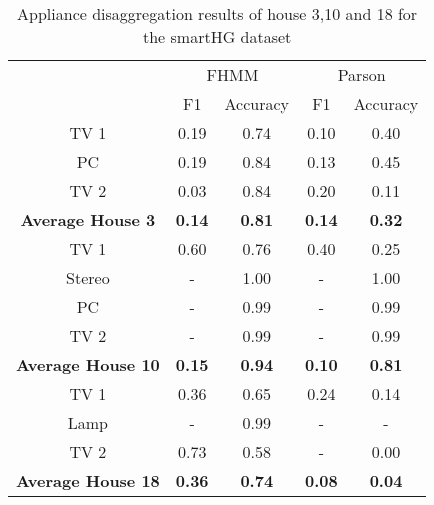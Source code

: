 \begin{table}[H]                             
\centering                                   
\begin{tabular}{c|c|c|c|c|}  
\cline{2-5}                                      
 & \multicolumn{2}{|c|}{FHMM} & \multicolumn{2}{c|}{Parson} \\                      
\cline{2-5}                                        
 & F1 & Accuracy & F1 & Accuracy \\          
\hline                                       
\multicolumn{1}{|c|}{TV 1 }& 0.19 & 0.74 & 0.10 & 0.40 \\          
\hline                                       
\multicolumn{1}{|c|}{PC }& 0.19 & 0.84 & 0.13 & 0.45 \\            
\hline                                       
\multicolumn{1}{|c|}{TV 2 }& 0.03 & 0.84 & 0.20 & 0.11 \\          
\hline                                       
\multicolumn{1}{|c|}{\textbf{Average House 3 }}& \textbf{0.14} & \textbf{0.81} & \textbf{0.14} & \textbf{0.32} \\ 
\hline                                       
\multicolumn{1}{|c|}{TV 1} & 0.60 & 0.76 & 0.40 & 0.25 \\          
\hline                                       
\multicolumn{1}{|c|}{Stereo }& - & 1.00 & - & 1.00 \\              
\hline                                       
\multicolumn{1}{|c|}{PC }& - & 0.99 & - & 0.99 \\                  
\hline                                       
\multicolumn{1}{|c|}{TV 2 }& - & 0.99 & - & 0.99 \\                
\hline                                       
\multicolumn{1}{|c|}{\textbf{Average House 10}} & \textbf{0.15} & \textbf{0.94} & \textbf{0.10} & \textbf{0.81} \\
\hline                                       
\multicolumn{1}{|c|}{TV 1} & 0.36 & 0.65 & 0.24 & 0.14 \\          
\hline                                       
\multicolumn{1}{|c|}{Lamp} & - & 0.99 & - & - \\                   
\hline                                       
\multicolumn{1}{|c|}{TV 2} & 0.73 & 0.58 & - & 0.00 \\             
\hline                                       
\multicolumn{1}{|c|}{\textbf{Average House 18} }& \textbf{0.36} & \textbf{0.74} & \textbf{0.08} & \textbf{0.04} \\
\hline                                       
\end{tabular}                                
\caption{Appliance disaggregation results of house 3,10 and 18 for the smartHG dataset}                     
\label{table:Tab:SHGREAL}                    
\end{table}  
